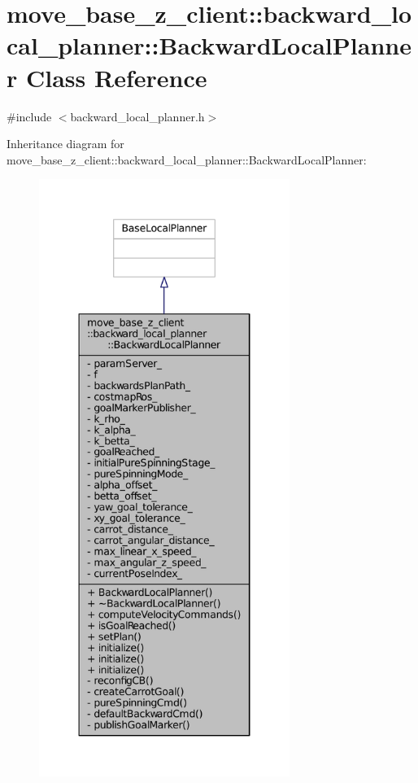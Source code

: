 \hypertarget{classmove__base__z__client_1_1backward__local__planner_1_1BackwardLocalPlanner}{}\section{move\+\_\+base\+\_\+z\+\_\+client\+:\+:backward\+\_\+local\+\_\+planner\+:\+:Backward\+Local\+Planner Class Reference}
\label{classmove__base__z__client_1_1backward__local__planner_1_1BackwardLocalPlanner}


{\ttfamily \#include $<$backward\+\_\+local\+\_\+planner.\+h$>$}



Inheritance diagram for move\+\_\+base\+\_\+z\+\_\+client\+:\+:backward\+\_\+local\+\_\+planner\+:\+:Backward\+Local\+Planner\+:
\nopagebreak
\begin{figure}[H]
\begin{center}
\leavevmode
\includegraphics[height=550pt]{classmove__base__z__client_1_1backward__local__planner_1_1BackwardLocalPlanner__inherit__graph}
\end{center}
\end{figure}


